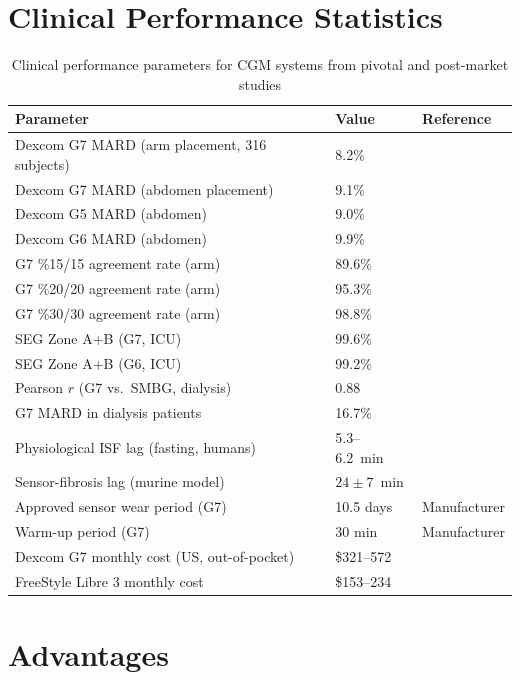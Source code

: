 \section{Clinical Performance Statistics}

\begin{table}[H]
\centering
\caption{Clinical performance parameters for CGM systems from pivotal and post-market studies}
\label{tab:cgm_stats}
\begin{tabular}{p{7.5cm}p{3.5cm}p{2.5cm}}
\toprule
\textbf{Parameter} & \textbf{Value} & \textbf{Reference} \\
\midrule
Dexcom G7 MARD (arm placement, 316 subjects) & 8.2\% & \cite{g7pivotal} \\
Dexcom G7 MARD (abdomen placement) & 9.1\% & \cite{g7pivotal} \\
Dexcom G5 MARD (abdomen) & 9.0\% & \cite{welsh2024} \\
Dexcom G6 MARD (abdomen) & 9.9\% & \cite{welsh2024} \\
G7 \%15/15 agreement rate (arm) & 89.6\% & \cite{g7pivotal} \\
G7 \%20/20 agreement rate (arm) & 95.3\% & \cite{g7pivotal} \\
G7 \%30/30 agreement rate (arm) & 98.8\% & \cite{g7pivotal} \\
SEG Zone A+B (G7, ICU) & 99.6\% & \cite{g7icu} \\
SEG Zone A+B (G6, ICU) & 99.2\% & \cite{g7icu} \\
Pearson $r$ (G7 vs.\ SMBG, dialysis) & 0.88 & \cite{dialysis2025} \\
G7 MARD in dialysis patients & 16.7\% & \cite{dialysis2025} \\
Physiological ISF lag (fasting, humans) & 5.3--6.2~min & \cite{basu2013lag} \\
Sensor-fibrosis lag (murine model) & $24 \pm 7$~min & \cite{bhatt2019lag} \\
Approved sensor wear period (G7) & 10.5 days & Manufacturer \\
Warm-up period (G7) & 30 min & Manufacturer \\
Dexcom G7 monthly cost (US, out-of-pocket) & \$321--572 & \cite{singlecare} \\
FreeStyle Libre 3 monthly cost & \$153--234 & \cite{singlecare} \\
\bottomrule
\end{tabular}
\end{table}

\section{Advantages}


